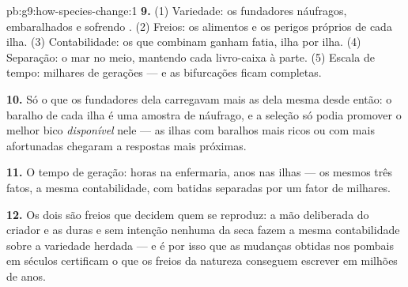 \begin{solution}{pb:g9:how-species-change:1}
\textbf{9.} (1) Variedade: os fundadores náufragos,
embaralhados e sofrendo . (2) Freios: os alimentos e
os perigos próprios de cada ilha. (3) Contabilidade: os
 que combinam ganham fatia, ilha por ilha. (4)
Separação: o mar no meio, mantendo cada livro-caixa à parte.
(5) Escala de tempo: milhares de gerações --- e as
bifurcações ficam completas.

\textbf{10.} Só o que os fundadores dela carregavam mais as
 dela mesma desde então: o baralho de cada ilha é uma
amostra de náufrago, e a seleção só podia promover o melhor
bico \emph{disponível} nele --- as ilhas com baralhos mais
ricos ou com  mais afortunadas chegaram a respostas
mais próximas.

\textbf{11.} O tempo de geração: horas na enfermaria, anos
nas ilhas --- os mesmos três fatos, a mesma contabilidade,
com batidas separadas por um fator de milhares.

\textbf{12.} Os dois são freios que decidem quem se
reproduz: a mão deliberada do criador e as  duras e
sem intenção nenhuma da seca fazem a mesma contabilidade
sobre a variedade herdada --- e é por isso que as mudanças
obtidas nos pombais em séculos certificam o que os freios da
natureza conseguem escrever em milhões de anos.
\end{solution}
